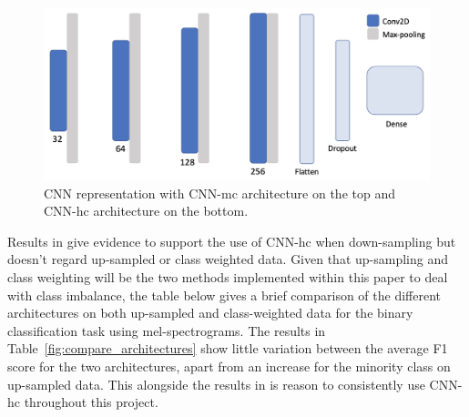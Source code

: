 \documentclass[11pt,a4paper,twoside]{article}
\begin{document}
\begin{figure}[h!]
    \centering
    \includegraphics[width = \textwidth]{Figures/CNN_architecture.png}
    \caption{CNN representation with CNN-mc architecture on the top and CNN-hc architecture on the bottom\cite{SmallData}.}
    \label{fig:CNN_architecture}
\end{figure}

Results in \cite{SmallData} give evidence to support the use of CNN-hc when down-sampling but doesn't regard up-sampled or class weighted data. Given that up-sampling and class weighting will be the two methods implemented within this paper to deal with class imbalance, the table below gives a brief comparison of the different architectures on both up-sampled and class-weighted data for the binary classification task using mel-spectrograms. The results in Table~\ref{fig:compare_architectures} show little variation between the average F1 score for the two architectures, apart from an increase for the minority class on up-sampled data. This alongside the results in \cite{SmallData} is reason to consistently use CNN-hc throughout this project.
\end{document}
